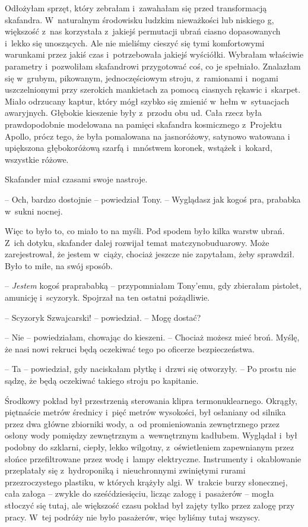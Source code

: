 \documentclass[oneside,polish,11pt,sfheadings]{mwbk}
\begin{document}
Odłożyłam sprzęt, który zebrałam i~zawahałam się przed transformacją
skafandra. W~naturalnym środowisku ludzkim nieważkości lub niskiego g,
większość z~nas korzystała z~jakiejś permutacji ubrań ciasno
dopasowanych i~lekko się unoszących. Ale nie mieliśmy cieszyć się tymi
komfortowymi warunkami przez jakiś czas i~potrzebowała jakiejś
wyściółki. Wybrałam właściwie parametry i~pozwoliłam skafandrowi
przygotować coś, co je spełniało. Znalazłam się w~grubym, pikowanym,
jednoczęściowym stroju, z~ramionami i~nogami uszczelnionymi przy
szerokich mankietach za pomocą ciasnych rękawic i~skarpet. Miało
odrzucany kaptur, który mógł szybko się zmienić w~hełm w~sytuacjach
awaryjnych. Głębokie kieszenie były z~przodu obu ud. Cała rzecz była
prawdopodobnie modelowana na pamięci skafandra kosmicznego z~Projektu
Apollo, prócz tego, że była pomalowana na jasnoróżowy, satynowo watowana
i upiększona głębokoróżową szarfą i~mnóstwem koronek, wstążek i~kokard,
wszystkie różowe.

Skafander miał czasami swoje nastroje.

-- Och, bardzo dostojnie -- powiedział Tony. -- Wyglądasz jak kogoś pra,
prababka w~sukni nocnej.

Więc to było to, co miało to na myśli. Pod spodem było kilka warstw
ubrań. Z~ich dotyku, skafander dalej rozwijał temat matczyno\dywiz buduarowy.
Może zarejestrował, że jestem w~ciąży, chociaż jeszcze nie zapytałam,
żeby sprawdził. Było to miłe, na swój sposób.

-- \textit{Jestem} kogoś praprababką -- przypomniałam Tony'emu, gdy
zbierałam pistolet, amunicję i~scyzoryk. Spojrzał na ten ostatni
pożądliwie.

-- Scyzoryk Szwajcarski! -- powiedział. -- Mogę dostać?

-- Nie -- powiedziałam, chowając do kieszeni. -- Chociaż możesz mieć broń.
Myślę, że nasi nowi rekruci będą oczekiwać tego po oficerze
bezpieczeństwa.

-- Ta -- powiedział, gdy naciskałam płytkę i~drzwi się otworzyły. -- Po
prostu nie sądzę, że będą oczekiwać takiego stroju po kapitanie.

Środkowy pokład był przestrzenią sterowania klipra termonuklearnego.
Okrągły, piętnaście metrów średnicy i~pięć metrów wysokości, był
osłaniany od silnika przez dwa główne zbiorniki wody, a~od
promieniowania zewnętrznego przez osłony wody pomiędzy zewnętrznym a~wewnętrznym kadłubem. Wyglądał i~był podobny do szklarni, ciepły, lekko
wilgotny, z~oświetleniem zapewnianym przez słońce przefiltrowane przez
wodę i~lampy elektryczne. Instrumenty i~okablowanie przeplatały się z~hydroponiką i~nieuchronnymi zwiniętymi rurami przezroczystego plastiku,
w których krążyły algi. W~trakcie burzy słonecznej, cała załoga -- zwykle
do sześćdziesięciu, licząc załogę i~pasażerów -- mogła stłoczyć się
tutaj, ale większość czasu pokład był zajęty tylko przez załogę przy
pracy. W~tej podróży nie było pasażerów, więc byliśmy tutaj wszyscy.
\end{document}
